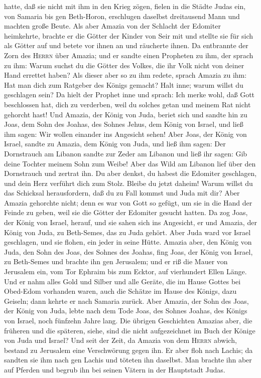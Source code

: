 hatte, daß sie nicht mit ihm in den Krieg zögen, fielen in die Städte
Judas ein, von Samaria bis gen Beth-Horon, erschlugen daselbst
dreitausend Mann und machten große Beute.  Als aber
Amazia von der Schlacht der Edomiter heimkehrte, brachte er die Götter
der Kinder von Seir mit und stellte sie für sich als Götter auf und
betete vor ihnen an und räucherte ihnen.  Da entbrannte
der Zorn des \textsc{Herrn} über Amazia; und er sandte einen Propheten
zu ihm, der sprach zu ihm: Warum suchst du die Götter des Volkes, die
ihr Volk nicht von deiner Hand errettet haben?  Als
dieser aber so zu ihm redete, sprach Amazia zu ihm: Hat man dich zum
Ratgeber des Königs gemacht? Halt inne; warum willst du geschlagen sein?
Da hielt der Prophet inne und sprach: Ich merke wohl, daß Gott
beschlossen hat, dich zu verderben, weil du solches getan und meinem Rat
nicht gehorcht hast!  Und Amazia, der König von Juda,
beriet sich und sandte hin zu Joas, dem Sohn des Joahas, des Sohnes
Jehus, dem König von Israel, und ließ ihm sagen: Wir wollen einander ins
Angesicht sehen!  Aber Joas, der König von Israel, sandte
zu Amazia, dem König von Juda, und ließ ihm sagen: Der Dornstrauch am
Libanon sandte zur Zeder am Libanon und ließ ihr sagen: Gib deine
Tochter meinem Sohn zum Weibe! Aber das Wild am Libanon lief über den
Dornstrauch und zertrat ihn.  Du aber denkst, du habest
die Edomiter geschlagen, und dein Herz verführt dich zum Stolz. Bleibe
du jetzt daheim! Warum willst du das Schicksal herausfordern, daß du zu
Fall kommst und Juda mit dir?  Aber Amazia gehorchte
nicht; denn es war von Gott so gefügt, um sie in die Hand der Feinde zu
geben, weil sie die Götter der Edomiter gesucht hatten. 
Da zog Joas, der König von Israel, herauf, und sie sahen sich ins
Angesicht, er und Amazia, der König von Juda, zu Beth-Semes, das zu Juda
gehört.  Aber Juda ward vor Israel geschlagen, und sie
flohen, ein jeder in seine Hütte.  Amazia aber, den König
von Juda, den Sohn des Joas, des Sohnes des Joahas, fing Joas, der König
von Israel, zu Beth-Semes und brachte ihn gen Jerusalem; und er riß die
Mauer von Jerusalem ein, vom Tor Ephraim bis zum Ecktor, auf vierhundert
Ellen Länge.  Und er nahm alles Gold und Silber und alle
Geräte, die im Hause Gottes bei Obed-Edom vorhanden waren, auch die
Schätze im Hause des Königs, dazu Geiseln; dann kehrte er nach Samaria
zurück.  Aber Amazia, der Sohn des Joas, der König von
Juda, lebte nach dem Tode Joas\textquotesingle, des Sohnes
Joahas\textquotesingle, des Königs von Israel, noch fünfzehn Jahre lang.
 Die übrigen Geschichten Amazias aber, die früheren und
die späteren, siehe, sind die nicht aufgezeichnet im Buch der Könige von
Juda und Israel?  Und seit der Zeit, da Amazia von dem
\textsc{Herrn} abwich, bestand zu Jerusalem eine Verschwörung gegen ihn.
Er aber floh nach Lachis; da sandten sie ihm nach gen Lachis und töteten
ihn daselbst.  Man brachte ihn aber auf Pferden und
begrub ihn bei seinen Vätern in der Hauptstadt Judas.

